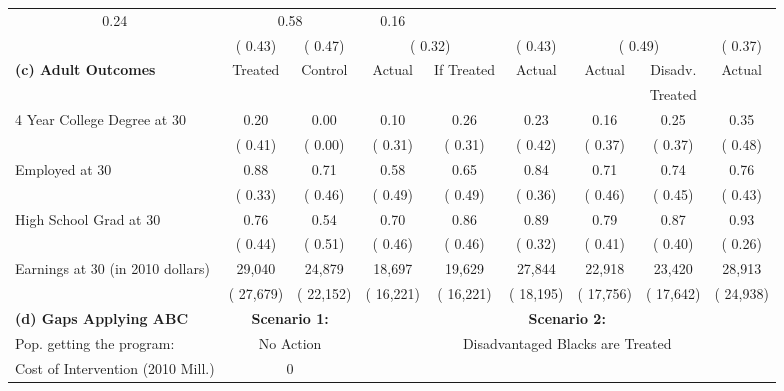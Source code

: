 \begin{table}[htbp]
\begin{center}
\begin{tabular}{lcccccccc}
\multicolumn{1}{c}{         0.24} &
\multicolumn{2}{c}{         0.58} &
\multicolumn{1}{c}{         0.16} 
 \\[0.05cm]  
 & (        0.43) & (        0.47) & \multicolumn{2}{c}{(        0.32)} &
\multicolumn{1}{c}{(        0.43)} &
\multicolumn{2}{c}{(        0.49)} &
\multicolumn{1}{c}{(        0.37)} 
 \\[0.2cm]  
\hline
\textbf{(c) Adult Outcomes} &Treated &Control  &Actual &If Treated &Actual &Actual &Disadv. &Actual \\[0.02cm] 
 & &  && & & & Treated & \\[0.2cm] 
4 Year College Degree at 30 &         0.20 &         0.00 &         0.10 &         0.26 &         0.23 &         0.16 &         0.25 &         0.35 \\[0.05cm]  
 & (        0.41) & (        0.00) & (        0.31) & (        0.31) & (        0.42) & (        0.37) & (        0.37) & (        0.48)   \\[0.2cm]  
Employed at 30 &         0.88 &         0.71 &         0.58 &         0.65 &         0.84 &         0.71 &         0.74 &         0.76 \\[0.05cm]  
 & (        0.33) & (        0.46) & (        0.49) & (        0.49) & (        0.36) & (        0.46) & (        0.45) & (        0.43)   \\[0.2cm]  
High School Grad at 30 &         0.76 &         0.54 &         0.70 &         0.86 &         0.89 &         0.79 &         0.87 &         0.93 \\[0.05cm]  
 & (        0.44) & (        0.51) & (        0.46) & (        0.46) & (        0.32) & (        0.41) & (        0.40) & (        0.26)   \\[0.2cm]  
Earnings at 30 (in 2010 dollars) &       29,040 &       24,879 &       18,697 &       19,629 &       27,844 &       22,918 &       23,420 &       28,913 \\[0.05cm]  
 & (      27,679) & (      22,152) & (      16,221) & (      16,221) & (      18,195) & (      17,756) & (      17,642) & (      24,938)   \\[0.2cm]  
\hline \hline
\textbf{(d) Gaps Applying ABC} & \multicolumn{2}{c}{\textbf{Scenario 1:}} &  &\multicolumn{4}{c}{\textbf{Scenario 2:}}   \\[0.2cm]  
 Pop. getting the program: & \multicolumn{2}{c}{No Action}   &  &\multicolumn{4}{c}{Disadvantaged Blacks are Treated}   \\[0.02cm]  
Cost of Intervention (2010 Mill.) &\multicolumn{2}{c}{ 0 } &

\end{tabular}
\end{center}
\end{table}
